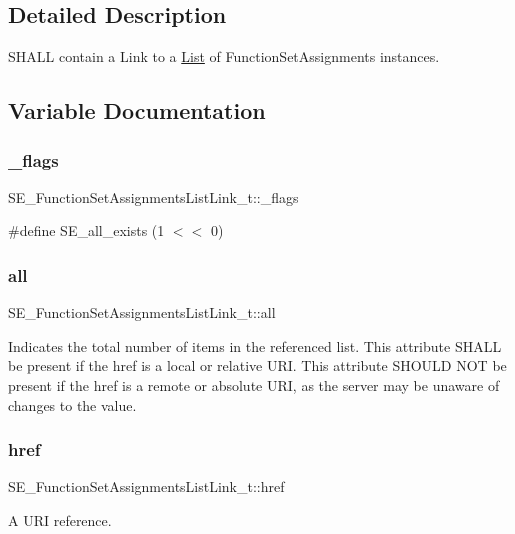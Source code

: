 \subsection{Detailed Description}
S\+H\+A\+LL contain a Link to a \hyperlink{structList}{List} of Function\+Set\+Assignments instances. 

\subsection{Variable Documentation}
\mbox{\label{group__FunctionSetAssignmentsListLink_ga83c38e7f0cf85bdeca600fa281b2e9b6}} 
\subsubsection{\texorpdfstring{\+\_\+flags}{\_flags}}
{\footnotesize\ttfamily S\+E\+\_\+\+Function\+Set\+Assignments\+List\+Link\+\_\+t\+::\+\_\+flags}

\#define S\+E\+\_\+all\+\_\+exists (1 $<$$<$ 0) \mbox{\label{group__FunctionSetAssignmentsListLink_ga1d29d4204c052e0aef55b98d374fc408}} 
\subsubsection{\texorpdfstring{all}{all}}
{\footnotesize\ttfamily S\+E\+\_\+\+Function\+Set\+Assignments\+List\+Link\+\_\+t\+::all}

Indicates the total number of items in the referenced list. This attribute S\+H\+A\+LL be present if the href is a local or relative U\+RI. This attribute S\+H\+O\+U\+LD N\+OT be present if the href is a remote or absolute U\+RI, as the server may be unaware of changes to the value. \mbox{\label{group__FunctionSetAssignmentsListLink_ga3036f6fd9dadbff2ae4835682285dc6d}} 
\subsubsection{\texorpdfstring{href}{href}}
{\footnotesize\ttfamily S\+E\+\_\+\+Function\+Set\+Assignments\+List\+Link\+\_\+t\+::href}

A U\+RI reference. 